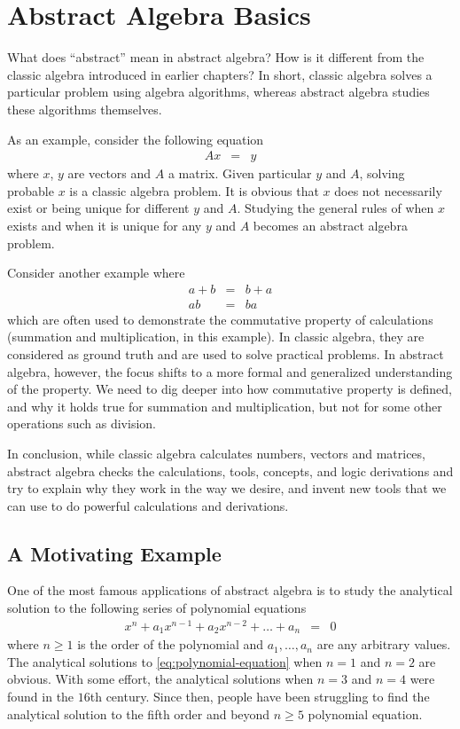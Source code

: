 \chapter{Abstract Algebra Basics}

What does ``abstract'' mean in abstract algebra? How is it different from the classic algebra introduced in earlier chapters? In short, classic algebra solves a particular problem using algebra algorithms, whereas abstract algebra studies these algorithms themselves.

As an example, consider the following equation
\begin{eqnarray}
  Ax &=& y \nonumber
\end{eqnarray}
where $x$, $y$ are vectors and $A$ a matrix. Given particular $y$ and $A$, solving probable $x$ is a classic algebra problem. It is obvious that $x$ does not necessarily exist or being unique for different $y$ and $A$. Studying the general rules of when $x$ exists and when it is unique for any $y$ and $A$ becomes an abstract algebra problem.

Consider another example where
\begin{eqnarray}
 a+b &=& b+a \nonumber \\
  ab &=& ba \nonumber
\end{eqnarray}
which are often used to demonstrate the commutative property of calculations (summation and multiplication, in this example). In classic algebra, they are considered as ground truth and are used to solve practical problems. In abstract algebra, however, the focus shifts to a more formal and generalized understanding of the property. We need to dig deeper into how commutative property is defined, and why it holds true for summation and multiplication, but not for some other operations such as division.

In conclusion, while classic algebra calculates numbers, vectors and matrices, abstract algebra checks the calculations, tools, concepts, and logic derivations and try to explain why they work in the way we desire, and invent new tools that we can use to do powerful calculations and derivations. 

\section{A Motivating Example}

One of the most famous applications of abstract algebra is to study the analytical solution to the following series of polynomial equations
\begin{eqnarray}
  x^n + a_1x^{n-1} + a_2x^{n-2} + \ldots + a_n &=& 0 \label{eq:polynomial-equation}
\end{eqnarray}
where $n\geq 1$ is the order of the polynomial and $a_1, \ldots, a_n$ are any arbitrary values. The analytical solutions to \eqref{eq:polynomial-equation} when $n=1$ and $n=2$ are obvious. With some effort, the analytical solutions when $n=3$ and $n=4$ were found in the $16$th century. Since then, people have been struggling to find the analytical solution to the fifth order and beyond $n\geq5$ polynomial equation.

